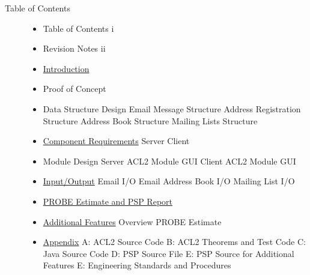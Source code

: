 \documentclass[11pt, letterpaper]{report}
\begin{document}
\begin{description}

\setcounter{page}{1}

\item[\Large{Table of Contents}] \hfill  
\begin{itemize}
\item Table of Contents \dotfill i
\item Revision Notes \dotfill ii
\item \hyperlink{Overview}{Introduction} 
\item Proof of Concept 
\item Data Structure Design 
\subitem Email Message Structure 
\subitem Address Registration Structure 
\subitem Address Book Structure 
\subitem Mailing Lists Structure 
\item \hyperlink{Project Requirements}{Component Requirements} 
\subitem Server 
\subitem Client 
\item Module Design 
\subitem Server 
\subsubitem ACL2 
\subsubitem Module 
\subsubitem GUI 
\subitem Client 
\subsubitem ACL2 
\subsubitem Module 
\subsubitem GUI 
\item \hyperlink{IO}{Input/Output} 
\subitem Email I/O 
\subitem Email Address Book I/O 
\subitem Mailing List I/O 
\item \hyperlink{PROBE Estimates}{PROBE Estimate and PSP Report} 
\item \hyperlink{Additional Features}{Additional Features} 
\subitem Overview 
\subitem PROBE Estimate 
\item \hyperlink{Appendix}{Appendix} 
\subitem A: ACL2 Source Code 
\subitem B: ACL2 Theorems and Test Code 
\subitem C: Java Source Code 
\subitem D: PSP Source File 
\subitem E: PSP Source for Additional Features 
\subitem E: Engineering Standards and Procedures 


\end{itemize}
\end{description}
\end{document}

